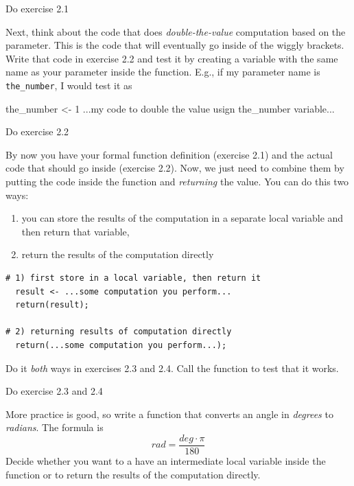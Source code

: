 \documentclass[
]{book}
\newenvironment{Shaded}{\begin{snugshade}}{\end{snugshade}}
\newcommand{\DecValTok}[1]{\textcolor[rgb]{0.00,0.00,0.81}{#1}}
\newcommand{\NormalTok}[1]{#1}
\newcommand{\OtherTok}[1]{\textcolor[rgb]{0.56,0.35,0.01}{#1}}
\providecommand{\tightlist}{%
  \setlength{\itemsep}{0pt}\setlength{\parskip}{0pt}}
\begin{document}
Do exercise 2.1

Next, think about the code that does \emph{double-the-value} computation based on the parameter. This is the code that will eventually go inside of the wiggly brackets. Write that code in exercise 2.2 and test it by creating a variable with the same name as your parameter inside the function. E.g., if my parameter name is \texttt{the\_number}, I would test it as

\begin{Shaded}
\begin{Highlighting}[]
\NormalTok{the\_number }\OtherTok{\textless{}{-}} \DecValTok{1}
\NormalTok{...my code to double the value usign the\_number variable...}
\end{Highlighting}
\end{Shaded}

Do exercise 2.2

By now you have your formal function definition (exercise 2.1) and the actual code that should go inside (exercise 2.2). Now, we just need to combine them by putting the code inside the function and \emph{returning} the value. You can do this two ways:

\begin{enumerate}
\def\labelenumi{\arabic{enumi})}
\tightlist
\item
  you can store the results of the computation in a separate local variable and then return that variable,
\item
  return the results of the computation directly
\end{enumerate}

\begin{verbatim}
# 1) first store in a local variable, then return it
  result <- ...some computation you perform...
  return(result);

# 2) returning results of computation directly
  return(...some computation you perform...);
\end{verbatim}

Do it \emph{both} ways in exercises 2.3 and 2.4. Call the function to test that it works.

Do exercise 2.3 and 2.4

More practice is good, so write a function that converts an angle in \emph{degrees} to \emph{radians}. The formula is
\[rad = \frac{deg \cdot \pi}{180}\]
Decide whether you want to a have an intermediate local variable inside the function or to return the results of the computation directly.
\end{document}
